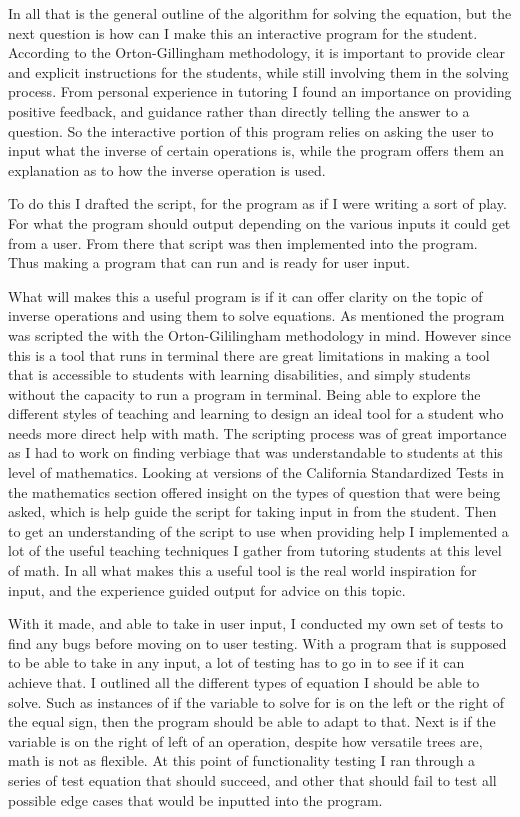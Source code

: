 \documentclass[10pt,twocolumn]{article}
\begin{document}
In all that is the general outline of the algorithm for solving the equation, but the next question is how can I make this an interactive program for the student. According to the Orton-Gillingham methodology, it is important to provide clear and explicit instructions for the students, while still involving them in the solving process. From personal experience in tutoring I found an importance on providing positive feedback, and guidance rather than directly telling the answer to a question. So the interactive portion of this program relies on asking the user to input what the inverse of certain operations is, while the program offers them an explanation as to how the inverse operation is used. 

To do this I drafted the script, for the program as if I were writing a sort of play. For what the program should output depending on the various inputs it could get from a user. From there that script was then implemented into the program. Thus making a program that can run and is ready for user input. 

What will makes this a useful program is if it can offer clarity on the topic of inverse operations and using them to solve equations. As mentioned the program was scripted the with the Orton-Gililingham methodology in mind. However since this is a tool that runs in terminal there are great limitations in making a tool that is accessible to students with learning disabilities, and simply students without the capacity to run a program in terminal. Being able to explore the different styles of teaching and learning to design an ideal tool for a student who needs more direct help with math. The scripting process was of great importance as I had to work on finding verbiage that was understandable to students at this level of mathematics. Looking at versions of the California Standardized Tests in the mathematics section offered insight on the types of question that were being asked, which is help guide the script for taking input in from the student. Then to get an understanding of the script to use when providing help I implemented a lot of the useful teaching techniques I gather from tutoring students at this level of math. In all what makes this a useful tool is the real world inspiration for input, and the experience guided output for advice on this topic. 



With it made, and able to take in user input, I conducted my own set of tests to find any bugs before moving on to user testing. With a program that is supposed to be able to take in any input, a lot of testing has to go in to see if it can achieve that. I outlined all the different types of equation I should be able to solve. Such as instances of if the variable to solve for is on the left or the right of the equal sign, then the program should be able to adapt to that. Next is if the variable is on the right of left of an operation, despite how versatile trees are, math is not as flexible. At this point of functionality testing I ran through a series of test equation that should succeed, and other that should fail to test all possible edge cases that would be inputted into the program.  
\end{document}
